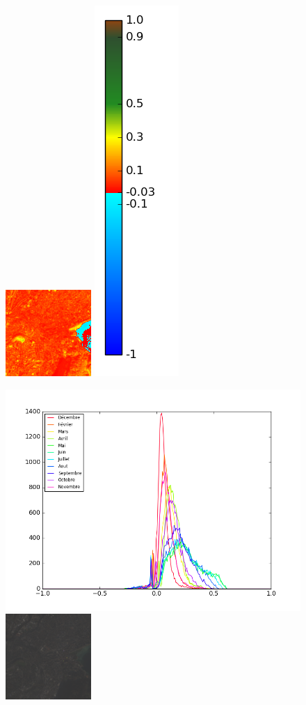\documentclass{book}
\begin{document}
\begin{figure}[H]
{\includegraphics[scale=0.7]{images/Annecy/12_ndvi.png}
\includegraphics[scale=0.2]{images/colormap.png}
}
\begin{center}
\includegraphics[scale=0.45]{images/Annecy/all_ndvi_histo.png}
\includegraphics[scale=1.2]{images/Annecy/12_rgb.png}


\end{center}
\end{figure}
\end{document}
